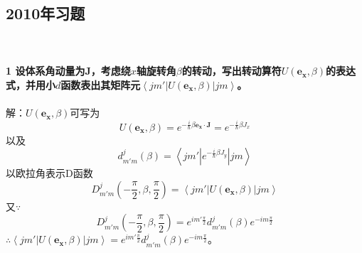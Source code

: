\documentclass[12pt]{article}
\numberwithin{equation}{section}	 %
\begin{document}
\begin{spacing}{1.5}
\subsection{2010年习题}
~\\
~\\
\textbf{1 \quad 设体系角动量为$\bm J$，考虑绕$x$轴旋转角$\beta$的转动，写出转动算符$U(\bm{e_{x}},\beta)$的表达式，并用小$d$函数表出其矩阵元$\displaystyle \left<jm'\left|U(\bm{e_{x}},\beta)\right|jm\right>$。}\\
~\\
解：$U(\bm{e_{x}},\beta)$可写为\\
\begin{equation}
U(\bm{e_{x}},\beta) = e^{-\frac{i}{\hbar}\beta\bm{e_{x}}\cdot\bm{J}} = e^{-\frac{i}{\hbar}\beta J_{x}}
\end{equation}
以及
\begin{equation}
d^{j}_{m'm}(\beta) = \left<jm'\left|e^{-\frac{i}{\hbar}\beta J_{y}}\right|jm\right>
\end{equation}
以欧拉角表示D函数
\begin{equation}
D_{m'm}^{j}(-\frac{\pi}{2},\beta,\frac{\pi}{2}) = \left<jm'\left|U(\bm{e_{x}},\beta)\right|jm\right>
\end{equation}
又$\because$
\begin{equation}
D_{m'm}^{j}(-\frac{\pi}{2},\beta,\frac{\pi}{2}) = e^{im'\frac{\pi}{2}}d_{m'm}^{j}(\beta)e^{-im\frac{\pi}{2}}
\end{equation}
$\therefore \left<jm'\left|U(\bm{e_{x}},\beta)\right|jm\right> = e^{im'\frac{\pi}{2}}d_{m'm}^{j}(\beta)e^{-im\frac{\pi}{2}}$。\\
~\\
~\\


\end{spacing}
\end{document}

